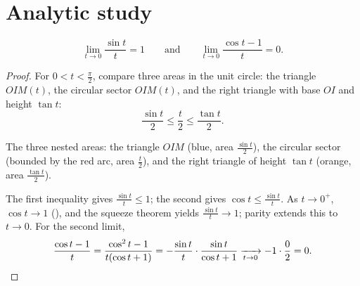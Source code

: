 \section{Analytic study}

\begin{lemma}\label{lem:g12:trigo:sinxx}
\[
\lim_{t \to 0} \frac{\sin t}{t} = 1
\qquad\text{and}\qquad
\lim_{t \to 0} \frac{\cos t - 1}{t} = 0 .
\]
\end{lemma}

\begin{proof}
For $0 < t < \frac{\pi}{2}$, compare three areas in the unit circle: the
triangle $OIM(t)$, the circular sector $OIM(t)$, and the right triangle with
base $OI$ and height $\tan t$:
\[
\frac{\sin t}{2} \leq \frac{t}{2} \leq \frac{\tan t}{2}.
\]

\begin{omfigure}

{\small The three nested areas: the triangle $OIM$ (blue, area
$\frac{\sin t}{2}$), the circular sector (bounded by the red arc, area
$\frac{t}{2}$), and the right triangle of height $\tan t$ (orange, area
$\frac{\tan t}{2}$).}
\end{omfigure}

The first inequality gives $\frac{\sin t}{t} \leq 1$; the second gives
$\cos t \leq \frac{\sin t}{t}$. As $t \to 0^+$, $\cos t \to 1$ (),
and the squeeze theorem yields $\frac{\sin t}{t} \to 1$; parity extends this
to $t \to 0$. For the second limit,
\[
\frac{\cos t - 1}{t} = \frac{\cos^2 t - 1}{t(\cos t + 1)}
= -\frac{\sin t}{t}\cdot\frac{\sin t}{\cos t + 1}
\xrightarrow[t\to0]{} -1 \cdot \frac{0}{2} = 0. \qedhere
\]
\end{proof}


